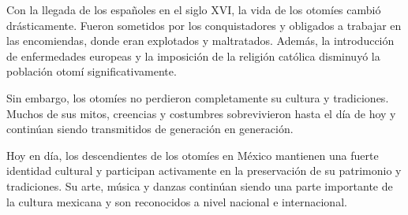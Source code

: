 Con la llegada de los españoles en el siglo XVI, la vida de los otomíes cambió drásticamente. Fueron sometidos por los conquistadores y obligados a trabajar en las encomiendas, donde eran explotados y maltratados. Además, la introducción de enfermedades europeas y la imposición de la religión católica disminuyó la población otomí significativamente.

Sin embargo, los otomíes no perdieron completamente su cultura y tradiciones. Muchos de sus mitos, creencias y costumbres sobrevivieron hasta el día de hoy y continúan siendo transmitidos de generación en generación.

Hoy en día, los descendientes de los otomíes en México mantienen una fuerte identidad cultural y participan activamente en la preservación de su patrimonio y tradiciones. Su arte, música y danzas continúan siendo una parte importante de la cultura mexicana y son reconocidos a nivel nacional e internacional.
